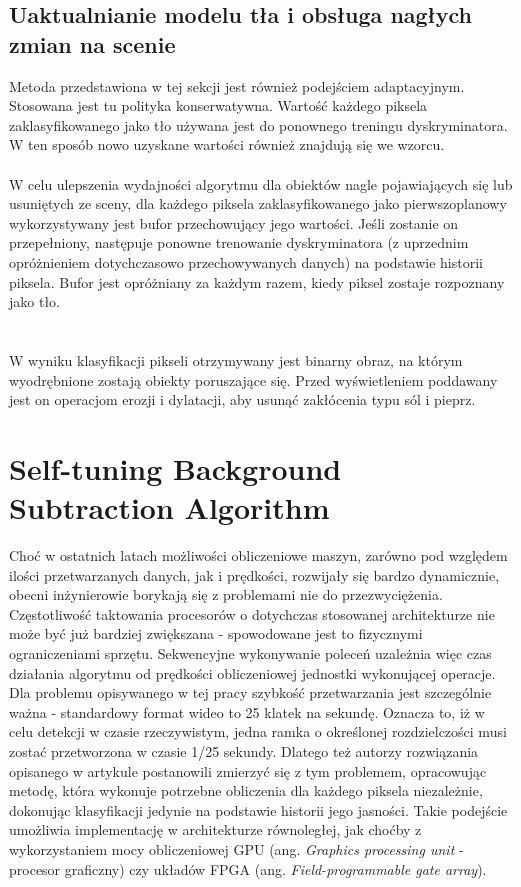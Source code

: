 \subsection{Uaktualnianie modelu tła i obsługa nagłych zmian na scenie}
Metoda przedstawiona w tej sekcji jest również podejściem adaptacyjnym. Stosowana jest tu polityka konserwatywna. Wartość każdego piksela zaklasyfikowanego jako tło używana jest do ponownego treningu dyskryminatora. W ten sposób nowo uzyskane wartości również znajdują się we wzorcu.
\paragraph{}
W celu ulepszenia wydajności algorytmu dla obiektów nagle pojawiających się lub usuniętych ze sceny, dla każdego piksela zaklasyfikowanego jako pierwszoplanowy wykorzystywany jest bufor przechowujący jego wartości. Jeśli zostanie on przepełniony, następuje ponowne trenowanie dyskryminatora (z uprzednim opróżnieniem dotychczasowo przechowywanych danych) na podstawie historii piksela. Bufor jest opróżniany za każdym razem, kiedy piksel zostaje rozpoznany jako tło. \\ \\
\paragraph{}
W wyniku klasyfikacji pikseli otrzymywany jest binarny obraz, na którym wyodrębnione zostają obiekty poruszające się. Przed wyświetleniem poddawany jest on operacjom erozji i dylatacji, aby usunąć zakłócenia typu sól i pieprz.
\section{Self-tuning Background Subtraction Algorithm}
\label{sec:BinWang}
Choć w ostatnich latach możliwości obliczeniowe maszyn, zarówno pod względem ilości przetwarzanych danych, jak i prędkości, rozwijały się bardzo dynamicznie, obecni inżynierowie borykają się z problemami nie do przezwyciężenia. Częstotliwość taktowania procesorów o dotychczas stosowanej architekturze nie może być już bardziej zwiększana - spowodowane jest to fizycznymi ograniczeniami sprzętu. Sekwencyjne wykonywanie poleceń uzależnia więc czas działania algorytmu od prędkości obliczeniowej jednostki wykonującej operacje. Dla problemu opisywanego w tej pracy szybkość przetwarzania jest szczególnie ważna - standardowy format wideo to 25 klatek na sekundę. Oznacza to, iż w celu detekcji w czasie rzeczywistym, jedna ramka o określonej rozdzielczości musi zostać przetworzona w czasie 1/25 sekundy. Dlatego też autorzy rozwiązania opisanego w artykule \cite{6910012} postanowili zmierzyć się z tym problemem, opracowując metodę, która wykonuje potrzebne obliczenia dla każdego piksela niezależnie, dokonując klasyfikacji jedynie na podstawie historii jego jasności. Takie podejście umożliwia implementację w architekturze równoległej, jak choćby z wykorzystaniem mocy obliczeniowej GPU (ang. \textit{Graphics processing unit} - procesor graficzny) czy układów FPGA (ang. \textit{Field-programmable gate array}).
